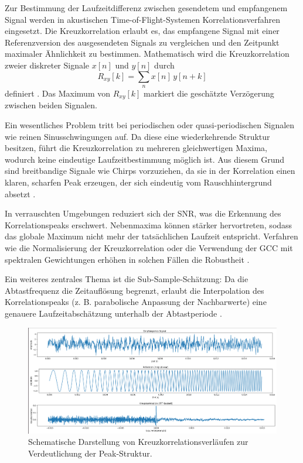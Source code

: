 Zur Bestimmung der Laufzeitdifferenz zwischen gesendetem und empfangenem Signal werden in akustischen Time-of-Flight-Systemen Korrelationsverfahren eingesetzt. Die Kreuzkorrelation erlaubt es, das empfangene Signal mit einer Referenzversion des ausgesendeten Signals zu vergleichen und den Zeitpunkt maximaler Ähnlichkeit zu bestimmen. Mathematisch wird die Kreuzkorrelation zweier diskreter Signale $x[n]$ und $y[n]$ durch
\[
R_{xy}[k] = \sum_{n} x[n] \, y[n+k]
\]
definiert \cite{oppenheim1999discrete}. Das Maximum von $R_{xy}[k]$ markiert die geschätzte Verzögerung zwischen beiden Signalen. 

Ein wesentliches Problem tritt bei periodischen oder quasi-periodischen Signalen wie reinen Sinusschwingungen auf. Da diese eine wiederkehrende Struktur besitzen, führt die Kreuzkorrelation zu mehreren gleichwertigen Maxima, wodurch keine eindeutige Laufzeitbestimmung möglich ist. Aus diesem Grund sind breitbandige Signale wie Chirps vorzuziehen, da sie in der Korrelation einen klaren, scharfen Peak erzeugen, der sich eindeutig vom Rauschhintergrund absetzt \cite{winkler1995range}.

In verrauschten Umgebungen reduziert sich der \ac{SNR}, was die Erkennung des Korrelationspeaks erschwert. Nebenmaxima können stärker hervortreten, sodass das globale Maximum nicht mehr der tatsächlichen Laufzeit entspricht. Verfahren wie die Normalisierung der Kreuzkorrelation oder die Verwendung der \ac{GCC} mit spektralen Gewichtungen erhöhen in solchen Fällen die Robustheit \cite{knapp1976generalized}. 

Ein weiteres zentrales Thema ist die Sub-Sample-Schätzung: Da die Abtastfrequenz die Zeitauflösung begrenzt, erlaubt die Interpolation des Korrelationspeaks (z. B. parabolische Anpassung der Nachbarwerte) eine genauere Laufzeitabschätzung unterhalb der Abtastperiode \cite{lyons2011understanding}.

\begin{figure}[h]
    \centering
    \includegraphics[width=0.9\linewidth]{korrelationsverlauf.png}
    \caption{Schematische Darstellung von Kreuzkorrelationsverläufen zur Verdeutlichung der Peak-Struktur.}
    \label{fig:correlation}
\end{figure}



